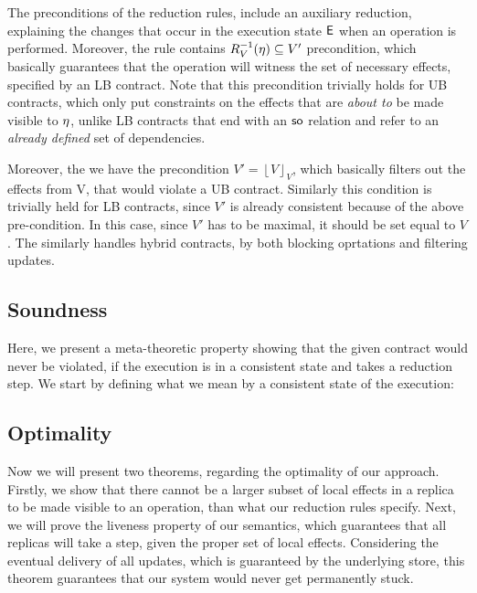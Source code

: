 The preconditions of the reduction rules, include an auxiliary
reduction, explaining the changes that occur in the execution state ${\normalfont \textsf{E}}$
when an operation is performed. 
Moreover, the rule contains
$R_V^{-1}(\eta)\subseteq V'$ precondition, which basically guarantees
that the operation will witness the set of necessary effects, specified
by an LB contract. Note that this precondition trivially holds for UB
contracts, which only put constraints on the effects that are
\emph{about to} be made
visible to $\eta$, unlike LB contracts that end with an ${\normalfont \textsf{so}}$ relation and
refer to an \emph{already defined} set of dependencies. 

Moreover, the we have the precondition $V' = \left \lfloor V \right
\rfloor_V$, which basically filters out the effects from V, that would
violate a UB contract. Similarly this condition is trivially held for LB
contracts, since $V'$ is
already consistent because of the above pre-condition. In this case,
since $V'$ has
to be maximal, it should be set equal to $V$. The 
similarly handles hybrid contracts, by both blocking oprtations and
filtering updates.

\subsection{Soundness}
\label{subsec:sound}
Here, we present a meta-theoretic property showing that the given contract would never be
violated, if the execution is in a consistent state and takes a reduction
step. We start by defining what we mean by a consistent state of the
execution: 


\subsection{Optimality}
\label{subsec:opt}
Now we will present two theorems, regarding the optimality of our
approach. Firstly, we show that there
cannot be a larger subset of local effects in a replica to be made
visible to an operation, than what
our reduction rules specify. Next, we will prove the liveness property
of our semantics, which guarantees that all replicas will take a step,
given the proper set of local effects. Considering the eventual delivery of all
updates, which is guaranteed by the underlying store, this theorem
guarantees  that our system would never get permanently stuck. 



